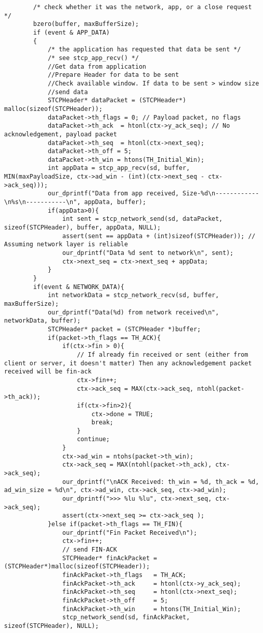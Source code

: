 \documentclass[11pt,a4paper,titlepage]{article}
\begin{document}
\begin{lstlisting}
        /* check whether it was the network, app, or a close request */
		bzero(buffer, maxBufferSize);
        if (event & APP_DATA)
        {
            /* the application has requested that data be sent */
            /* see stcp_app_recv() */
			//Get data from application	
			//Prepare Header for data to be sent
			//Check available window. If data to be sent > window size
			//send data
			STCPHeader* dataPacket = (STCPHeader*) malloc(sizeof(STCPHeader));
			dataPacket->th_flags = 0; // Payload packet, no flags
			dataPacket->th_ack	= htonl(ctx->y_ack_seq); // No acknowledgement, payload packet
			dataPacket->th_seq	= htonl(ctx->next_seq);
			dataPacket->th_off = 5;
			dataPacket->th_win = htons(TH_Initial_Win); 
			int appData = stcp_app_recv(sd, buffer, MIN(maxPayloadSize, ctx->ad_win - (int)(ctx->next_seq - ctx->ack_seq)));
			our_dprintf("Data from app received, Size-%d\n------------\n%s\n-----------\n", appData, buffer);
			if(appData>0){
				int sent = stcp_network_send(sd, dataPacket, sizeof(STCPHeader), buffer, appData, NULL);
				assert(sent == appData + (int)sizeof(STCPHeader)); // Assuming network layer is reliable
				our_dprintf("Data %d sent to network\n", sent);
				ctx->next_seq = ctx->next_seq + appData;
			}
        }
		if(event & NETWORK_DATA){
			int networkData = stcp_network_recv(sd, buffer, maxBufferSize);
			our_dprintf("Data(%d) from network received\n", networkData, buffer);
			STCPHeader* packet = (STCPHeader *)buffer;
			if(packet->th_flags == TH_ACK){
				if(ctx->fin > 0){
					// If already fin received or sent (either from client or server, it doesn't matter) Then any acknowledgement packet received will be fin-ack
					ctx->fin++;
					ctx->ack_seq = MAX(ctx->ack_seq, ntohl(packet->th_ack));
					if(ctx->fin>2){
						ctx->done = TRUE;
						break;
					}
					continue;
				}
				ctx->ad_win = ntohs(packet->th_win);
				ctx->ack_seq = MAX(ntohl(packet->th_ack), ctx->ack_seq);
				our_dprintf("\nACK Received: th_win = %d, th_ack = %d, ad_win_size = %d\n", ctx->ad_win, ctx->ack_seq, ctx->ad_win);
				our_dprintf(">>> %lu %lu", ctx->next_seq, ctx->ack_seq);
				assert(ctx->next_seq >= ctx->ack_seq );
			}else if(packet->th_flags == TH_FIN){
				our_dprintf("Fin Packet Received\n");
				ctx->fin++;
				// send FIN-ACK
				STCPHeader* finAckPacket = (STCPHeader*)malloc(sizeof(STCPHeader));
				finAckPacket->th_flags   = TH_ACK; 
				finAckPacket->th_ack	 = htonl(ctx->y_ack_seq); 
				finAckPacket->th_seq	 = htonl(ctx->next_seq);
				finAckPacket->th_off     = 5;
				finAckPacket->th_win     = htons(TH_Initial_Win);
				stcp_network_send(sd, finAckPacket, sizeof(STCPHeader), NULL);

\end{lstlisting}
\end{document}
